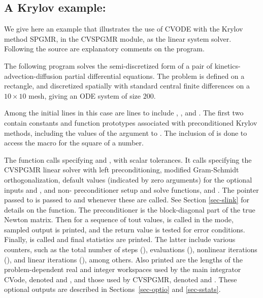 \subsection{A Krylov example: }\label{ss:cvkx}

We give here an example that illustrates the use of CVODE with the
Krylov method SPGMR, in the CVSPGMR module, as the linear system
solver.  Following the source are explanatory comments on the program.

The following program solves the semi-discretized form of a pair of
kinetics-advection-diffusion partial differential equations.  The
problem is defined on a rectangle, and discretized spatially with
standard central finite differences on a $10 \times 10$ mesh, giving
an ODE system of size $200$.

Among the initial  lines in this case are lines to
include , , and .
The first two contain constants and function prototypes associated
with preconditioned Krylov methods, including the values of the
 argument to .  The inclusion
of  is done to access the  macro for the
square of a  number.

The  function calls  specifying  and
, with scalar tolerances.  It calls  specifying
the CVSPGMR linear solver with left preconditioning, modified Gram-Schmidt
orthogonalization, default values
(indicated by zero arguments) for the optional inputs  and ,
and non- preconditioner setup and solve functions,  and
. The  pointer passed to  is passed to
 and  whenever these are called. See
Section \ref{sec-slink} for details on the  function.  
The preconditioner is the block-diagonal part of the true Newton matrix. 
Then for a sequence of tout values,  is called in the
 mode, sampled output is printed, and the return value is
tested for error conditions.  Finally,  is called and
final statistics are printed.  The latter include various counters,
such as the total number of steps (),  evaluations
(), nonlinear iterations (), and linear iterations
(), among others.  Also printed are the lengths of the
problem-dependent real and integer workspaces used by the main
integrator CVode, denoted  and , and those
used by CVSPGMR, denoted  and .
These optional outputs are described in Sections~\ref{sec-optio}
and \ref{sec-sstats}.

